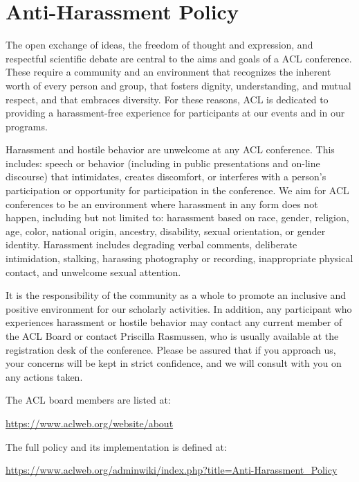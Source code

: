 \chapter[Anti-Harassment Policy]{Anti-Harassment Policy}
\thispagestyle{emptyheader}
\setheaders{}{}

The open exchange of ideas, the freedom of thought and expression, and
respectful scientific debate are central to the aims and goals of a
ACL conference. These require a community and an environment that
recognizes the inherent worth of every person and group, that fosters
dignity, understanding, and mutual respect, and that embraces
diversity. For these reasons, ACL is dedicated to providing a
harassment-free experience for participants at our events and in our
programs. 

Harassment and hostile behavior are unwelcome at any ACL
conference. This includes: speech or behavior (including in public
presentations and on-line discourse) that intimidates, creates
discomfort, or interferes with a person’s participation or opportunity
for participation in the conference. We aim for ACL conferences to
be an environment where harassment in any form does not happen,
including but not limited to: harassment based on race, gender,
religion, age, color, national origin, ancestry, disability, sexual
orientation, or gender identity. Harassment includes degrading verbal
comments, deliberate intimidation, stalking, harassing photography or
recording, inappropriate physical contact, and unwelcome sexual
attention. 

It is the responsibility of the community as a whole to promote an
inclusive and positive environment for our scholarly activities. In
addition, any participant who experiences harassment or hostile
behavior may contact any current member of the ACL Board or contact
Priscilla Rasmussen, who is usually available at the registration desk
of the conference. Please be assured that if you approach us, your
concerns will be kept in strict confidence, and we will consult with
you on any actions taken. 

The ACL board members are listed at:

\url{https://www.aclweb.org/website/about}

The full policy and its implementation is defined at:

\url{https://www.aclweb.org/adminwiki/index.php?title=Anti-Harassment_Policy}
